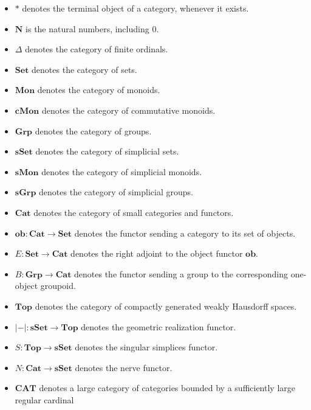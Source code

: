 \documentclass{tac}
\begin{document}
\begin{itemize}
    \item $*$ denotes the terminal object of a category, whenever it exists.
    \item $\mathbf{N}$ is the natural numbers, including $0$.
    \item $\Delta$ denotes the category of finite ordinals.
    \item $\mathbf{Set}$ denotes the category of sets.
    \item $\mathbf{Mon}$ denotes the category of monoids.
    \item $\mathbf{cMon}$ denotes the category of commutative monoids.
    \item $\mathbf{Grp}$ denotes the category of groups.
    \item $\mathbf{sSet}$ denotes the category of simplicial sets.
    \item $\mathbf{sMon}$ denotes the category of simplicial monoids.
    \item $\mathbf{sGrp}$ denotes the category of simplicial groups.
    \item $\mathbf{Cat}$ denotes the category of small categories and functors.
    \item $\mathbf{ob}:\mathbf{Cat}\to\mathbf{Set}$ denotes the functor sending a category to its set of objects.
    \item $E:\mathbf{Set}\to\mathbf{Cat}$ denotes the right adjoint to the object functor $\mathbf{ob}$.
    \item $B:\mathbf{Grp}\to\mathbf{Cat}$ denotes the functor sending a group to the corresponding one-object groupoid.
    \item $\mathbf{Top}$ denotes the category of compactly generated weakly Hausdorff spaces.
    \item $|-|:\mathbf{sSet}\to\mathbf{Top}$ denotes the geometric realization functor.
    \item $S:\mathbf{Top}\to\mathbf{sSet}$ denotes the singular simplices functor.
    \item $N:\mathbf{Cat}\to\mathbf{sSet}$ denotes the nerve functor.
    \item $\mathbf{CAT}$ denotes a large category of categories bounded by a sufficiently large regular cardinal
\end{itemize}




\end{document}
